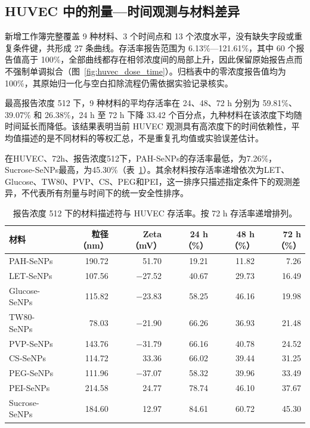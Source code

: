 \documentclass[letterpaper]{article}
\begin{document}
\subsection{HUVEC 中的剂量—时间观测与材料差异}

新增工作簿完整覆盖 9 种材料、3 个时间点和 13 个浓度水平，没有缺失字段或重复条件键，共形成 27 条曲线。存活率报告范围为 6.13\%—121.61\%，其中 60 个报告值高于 100\%，全部曲线都存在相邻浓度间的局部上升，因此保留原始报告点而不强制单调拟合（图~\ref{fig:huvec_dose_time}）。归档表中的零浓度报告值均为 100\%，其原始归一化与空白扣除流程仍需依据实验记录核实。

最高报告浓度 512 下，9 种材料的平均存活率在 24、48、72 h 分别为 59.81\%、39.07\% 和 26.38\%，24 h 至 72 h 下降 33.42 个百分点，九种材料在该浓度下均随时间延长而降低。该结果表明当前 HUVEC 观测具有高浓度下的时间依赖性，平均值描述的是不同材料的等权汇总，不是重复孔均值或实验误差估计。

在HUVEC、72h、报告浓度512下，PAH-SeNPs的存活率最低，为\nobreakspace{}7.26\%，Sucrose-SeNPs最高，为\nobreakspace{}45.30\%（表~\ref{tab:huvec_materials}）。其余材料按存活率递增依次为LET、Glucose、TW80、PVP、CS、PEG和PEI，这一排序只描述指定条件下的观测差异，不代表所有剂量与时间下的统一安全性排序。

\begin{table}[H]
\centering
\caption{报告浓度 512 下的材料描述符与 HUVEC 存活率。按 72 h 存活率递增排列。}
\label{tab:huvec_materials}
\small
\begin{tabular}{lrrrrr}
\toprule
材料 & 粒径（nm） & Zeta（mV） & 24 h（\%） & 48 h（\%） & 72 h（\%） \\
\midrule
PAH-SeNPs & 190.72 & 51.70 & 19.21 & 11.82 & 7.26 \\
LET-SeNPs & 107.56 & \ensuremath{\mathord{-}}27.52 & 40.67 & 29.73 & 16.49 \\
Glucose-SeNPs & 115.82 & \ensuremath{\mathord{-}}23.83 & 58.25 & 46.16 & 19.98 \\
TW80-SeNPs & 78.03 & \ensuremath{\mathord{-}}21.90 & 66.26 & 36.93 & 21.48 \\
PVP-SeNPs & 143.76 & \ensuremath{\mathord{-}}31.79 & 66.16 & 40.78 & 24.52 \\
CS-SeNPs & 114.72 & 33.36 & 66.02 & 39.44 & 31.25 \\
PEG-SeNPs & 111.96 & \ensuremath{\mathord{-}}37.07 & 58.32 & 39.96 & 33.49 \\
PEI-SeNPs & 214.58 & 24.77 & 78.74 & 46.10 & 37.67 \\
Sucrose-SeNPs & 184.60 & 12.97 & 84.61 & 60.72 & 45.30 \\
\bottomrule
\end{tabular}

\end{table}
\end{document}
